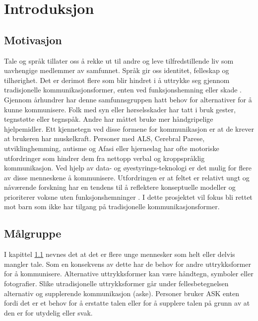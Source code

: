 \documentclass[phd,tocprelim]{cornell}
\begin{document}
\normalspacing \setcounter{page}{1} 
\pagestyle{cornell} \addtolength{\parskip}{0.5\baselineskip}



\chapter{Introduksjon}




\section{Motivasjon}
\label{sec:motivasjon}

Tale og språk tillater oss å rekke ut til andre og leve tilfredstillende liv som uavhengige medlemmer av samfunnet. Språk gir oss identitet, felleskap  og tilhørighet. Det er derimot flere som blir hindret i å uttrykke seg gjennom tradisjonelle kommunikasjonsformer, enten ved funksjonshemning eller skade  \cite{tobii}. Gjennom århundrer har denne samfunnsgruppen hatt behov for alternativer for å kunne kommunisere. Folk med syn eller hørselsskader har tatt i bruk gester, tegnstøtte eller tegnspåk. Andre har måttet bruke mer håndgripelige hjelpemidler. Ett kjennetegn ved disse formene for kommunikasjon er at de krever at brukeren har muskelkraft. Personer med ALS, Cerebral Parese, utviklinghemming, autisme og Afasi eller hjerneslag har ofte motoriske utfordringer som hindrer dem fra nettopp verbal og kroppspråklig kommunikasjon. Ved hjelp av data- og øyestyrings-teknologi er det mulig for flere av disse menneskene å kommunisere. Utfordringen er at feltet er relativt ungt og nåværende forskning har en tendens til å reflektere konseptuelle modeller og prioriterer voksne uten funksjonshemninger \cite{aac}. I dette prosjektet vil fokus bli rettet mot barn som ikke har tilgang på tradisjonelle kommunikasjonsformer.




\section{Målgruppe}

I kapittel \ref{sec:motivasjon} nevnes det at det er flere unge mennesker som helt eller delvis mangler tale. Som en konsekvens av dette har de behov for andre uttrykksformer for å kommunisere. Alternative uttrykksformer kan være håndtegn, symboler eller fotografier. Slike utradisjonelle uttrykksformer går under fellesbetegnelsen alternativ og supplerende kommunikasjon (\gls{aske}).
Personer bruker ASK enten fordi det er et behov for å erstatte talen eller for å supplere talen på grunn av at den er for utydelig eller svak. 
\end{document}

